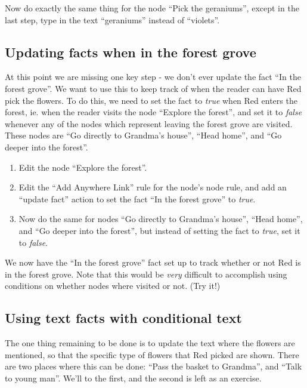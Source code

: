 \documentclass{article}
\begin{document}
Now do exactly the same thing for the node ``Pick the geraniums'', except in
the last step, type in the text ``geraniums'' instead of ``violets''.

\subsection{Updating facts when in the forest grove}

At this point we are missing one key step - we don't ever update the fact ``In
the forest grove''. We want to use this to keep track of when the reader can have
Red pick the flowers. To do this, we need to set the fact to \textit{true} when
Red enters the forest, ie. when the reader visits the node ``Explore the
forest'', and set it to \textit{false} whenever any of the nodes which represent
leaving the forest grove are visited. These nodes are ``Go directly to Grandma's
house'', ``Head home'', and ``Go deeper into the forest''.

\begin{enumerate}
  \item Edit the node ``Explore the forest''.
  \item Edit the ``Add Anywhere Link'' rule for the node's node rule, and add
  an ``update fact'' action to set the fact ``In the forest grove'' to
  \textit{true}.
  \item Now do the same for nodes ``Go directly to Grandma's house'', ``Head
  home'', and ``Go deeper into the forest'', but instead of setting the fact to
  \textit{true}, set it to \textit{false}.
\end{enumerate}

We now have the ``In the forest grove'' fact set up to track whether or not Red
is in the forest grove. Note that this would be \textit{very} difficult to
accomplish using conditions on whether nodes where visited or not. (Try it!)

\subsection{Using text facts with conditional text}

The one thing remaining to be done is to update the text where the flowers are
mentioned, so that the specific type of flowers that Red picked are shown.
There are two places where this can be done: ``Pass the basket to Grandma'',
and ``Talk to young man''. We'll to the first, and the second is left as an
exercise.
\end{document}
